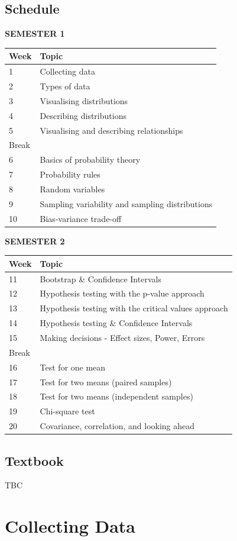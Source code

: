 \documentclass[]{book}
\begin{document}
\hypertarget{schedule}{%
\section*{Schedule}\label{schedule}}

\textbf{SEMESTER 1}

\begin{longtable}[]{@{}ll@{}}
\toprule
Week & Topic\tabularnewline
\midrule
\endhead
1 & Collecting data\tabularnewline
2 & Types of data\tabularnewline
3 & Visualising distributions\tabularnewline
4 & Describing distributions\tabularnewline
5 & Visualising and describing relationships\tabularnewline
Break &\tabularnewline
6 & Basics of probability theory\tabularnewline
7 & Probability rules\tabularnewline
8 & Random variables\tabularnewline
9 & Sampling variability and sampling distributions\tabularnewline
10 & Bias-variance trade-off\tabularnewline
\bottomrule
\end{longtable}

\textbf{SEMESTER 2}

\begin{longtable}[]{@{}ll@{}}
\toprule
Week & Topic\tabularnewline
\midrule
\endhead
11 & Bootstrap \& Confidence Intervals\tabularnewline
12 & Hypothesis testing with the p-value approach\tabularnewline
13 & Hypothesis testing with the critical values approach\tabularnewline
14 & Hypothesis testing \& Confidence Intervals\tabularnewline
15 & Making decisions - Effect sizes, Power, Errors\tabularnewline
Break &\tabularnewline
16 & Test for one mean\tabularnewline
17 & Test for two means (paired samples)\tabularnewline
18 & Test for two means (independent samples)\tabularnewline
19 & Chi-square test\tabularnewline
20 & Covariance, correlation, and looking ahead\tabularnewline
\bottomrule
\end{longtable}

\hypertarget{textbook}{%
\section*{Textbook}\label{textbook}}

TBC

\hypertarget{chap-collecting-data}{%
\chapter{Collecting Data}\label{chap-collecting-data}}
\end{document}
